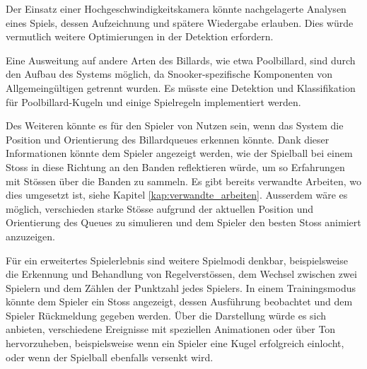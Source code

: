 Der Einsatz einer Hochgeschwindigkeitskamera könnte nachgelagerte Analysen eines Spiels,
dessen Aufzeichnung und spätere Wiedergabe erlauben.
Dies würde vermutlich weitere Optimierungen in der Detektion erfordern.

Eine Ausweitung auf andere Arten des Billards, wie etwa Poolbillard, sind durch den Aufbau des Systems möglich, da
Snooker-spezifische Komponenten von Allgemeingültigen getrennt wurden.
Es müsste eine Detektion und Klassifikation für Poolbillard-Kugeln und einige Spielregeln implementiert werden.

Des Weiteren könnte es für den Spieler von Nutzen sein, wenn das System die Position und Orientierung des Billardqueues
erkennen könnte.
Dank dieser Informationen könnte dem Spieler angezeigt werden, wie der Spielball bei einem Stoss in diese Richtung
an den Banden reflektieren würde, um so Erfahrungen mit Stössen über die Banden zu sammeln.
Es gibt bereits verwandte Arbeiten, wo dies umgesetzt ist, siehe Kapitel \ref{kap:verwandte_arbeiten}.
Ausserdem wäre es möglich, verschieden starke Stösse aufgrund der aktuellen Position und Orientierung des Queues zu simulieren
und dem Spieler den besten Stoss animiert anzuzeigen.

Für ein erweitertes Spielerlebnis sind weitere Spielmodi denkbar, beispielsweise die Erkennung und Behandlung von
Regelverstössen, dem Wechsel zwischen zwei Spielern und dem Zählen der Punktzahl jedes Spielers.
In einem Trainingsmodus könnte dem Spieler ein Stoss angezeigt, dessen Ausführung beobachtet und dem Spieler
Rückmeldung gegeben werden.
Über die Darstellung würde es sich anbieten, verschiedene Ereignisse mit speziellen Animationen oder über Ton hervorzuheben,
beispielsweise wenn ein Spieler eine Kugel erfolgreich einlocht, oder wenn der Spielball ebenfalls versenkt wird.

